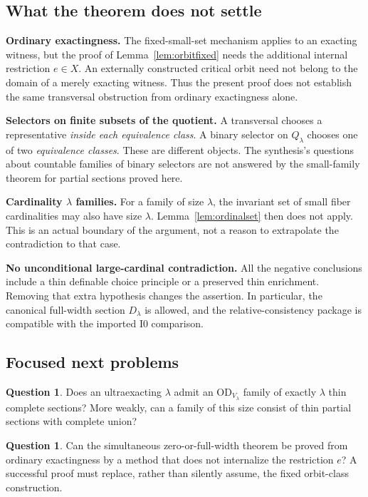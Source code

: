 \documentclass[11pt,letterpaper]{article}
\theoremstyle{definition}
\newtheorem{question}[definition]{Question}
\numberwithin{equation}{section}
\newcommand{\OD}{\mathrm{OD}}
\newcommand{\Izero}{\mathrm{I0}}
\begin{document}
\subsection{What the theorem does not settle}

\textbf{Ordinary exactingness.}
The fixed-small-set mechanism applies to an exacting witness, but the proof of Lemma~\ref{lem:orbitfixed} needs the additional internal restriction $e\in X$. An externally constructed critical orbit need not belong to the domain of a merely exacting witness. Thus the present proof does not establish the same transversal obstruction from ordinary exactingness alone.

\textbf{Selectors on finite subsets of the quotient.}
A transversal chooses a representative \emph{inside each equivalence class}. A binary selector on $Q_\lambda$ chooses one of two \emph{equivalence classes}. These are different objects. The synthesis's questions about countable families of binary selectors are not answered by the small-family theorem for partial sections proved here.

\textbf{Cardinality $\lambda$ families.}
For a family of size $\lambda$, the invariant set of small fiber cardinalities may also have size $\lambda$. Lemma~\ref{lem:ordinalset} then does not apply. This is an actual boundary of the argument, not a reason to extrapolate the contradiction to that case.

\textbf{No unconditional large-cardinal contradiction.}
All the negative conclusions include a thin definable choice principle or a preserved thin enrichment. Removing that extra hypothesis changes the assertion. In particular, the canonical full-width section $D_\lambda$ is allowed, and the relative-consistency package is compatible with the imported $\Izero$ comparison.

\subsection{Focused next problems}

\begin{question}
Does an ultraexacting $\lambda$ admit an $\OD_{V_\lambda}$ family of exactly $\lambda$ thin complete sections? More weakly, can a family of this size consist of thin partial sections with complete union?
\end{question}

\begin{question}
Can the simultaneous zero-or-full-width theorem be proved from ordinary exactingness by a method that does not internalize the restriction $e$? A successful proof must replace, rather than silently assume, the fixed orbit-class construction.
\end{question}
\end{document}
